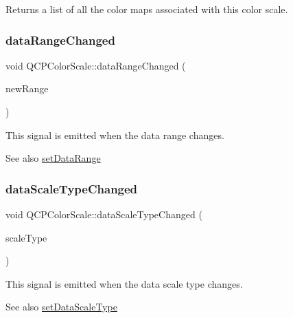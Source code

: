 Returns a list of all the color maps associated with this color scale. \mbox{\label{classQCPColorScale_a685717490a6aa83c5e711a4f34e837f9}} 
\subsubsection{\texorpdfstring{data\+Range\+Changed}{dataRangeChanged}}
{\footnotesize\ttfamily void Q\+C\+P\+Color\+Scale\+::data\+Range\+Changed (\begin{DoxyParamCaption}\item[{const \hyperlink{classQCPRange}{Q\+C\+P\+Range} \&}]{new\+Range }\end{DoxyParamCaption})\hspace{0.3cm}{\ttfamily [signal]}}

This signal is emitted when the data range changes.

\begin{DoxySeeAlso}{See also}
\hyperlink{classQCPColorScale_abe88633003a26d1e756aa74984587fef}{set\+Data\+Range} 
\end{DoxySeeAlso}
\mbox{\label{classQCPColorScale_a61558b962f7791ff2f15a565dcf60181}} 
\subsubsection{\texorpdfstring{data\+Scale\+Type\+Changed}{dataScaleTypeChanged}}
{\footnotesize\ttfamily void Q\+C\+P\+Color\+Scale\+::data\+Scale\+Type\+Changed (\begin{DoxyParamCaption}\item[{\hyperlink{classQCPAxis_a36d8e8658dbaa179bf2aeb973db2d6f0}{Q\+C\+P\+Axis\+::\+Scale\+Type}}]{scale\+Type }\end{DoxyParamCaption})\hspace{0.3cm}{\ttfamily [signal]}}

This signal is emitted when the data scale type changes.

\begin{DoxySeeAlso}{See also}
\hyperlink{classQCPColorScale_aeb6107d67dd7325145b2498abae67fc3}{set\+Data\+Scale\+Type} 
\end{DoxySeeAlso}
\mbox{\label{classQCPColorScale_a5e5f8c5626242c8f7308bfab74d3d989}} 
